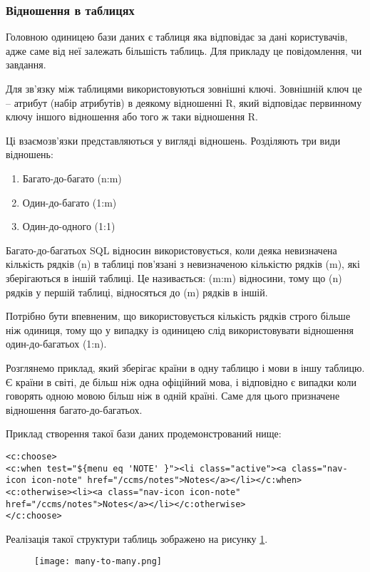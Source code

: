 \subsubsection{Відношення в таблицях}
\par Головною одиницею бази даних є таблиця яка відповідає за дані користувачів, адже саме від неї залежать більшість таблиць. Для прикладу це повідомлення, чи завдання.
\par Для зв'язку між таблицями використовуються зовнішні ключі. Зовнішній ключ це -- атрибут (набір атрибутів) в деякому відношенні R, який відповідає первинному ключу іншого відношення або того ж таки відношення R.
\par Ці взаємозв'язки представляються у вигляді відношень. Розділяють три види відношень:
\begin{enumerate}
	\item Багато-до-багато (n:m)
	\item Один-до-багато (1:m)
	\item Один-до-одного (1:1)
\end{enumerate}
\par Багато-до-багатьох SQL відносин використовується, коли деяка невизначена кількість рядків (n) в таблиці пов'язані з невизначеною кількістю рядків (m), які зберігаються в іншій таблиці. Це називається: (m:m) відносини, тому що (n) рядків у першій таблиці, відносяться до (m) рядків в іншій.
\par Потрібно бути впевненим, що використовується кількість рядків строго більше ніж одиниця, тому що у випадку із одиницею слід використовувати відношення один-до-багатьох (1:n).
\par Розглянемо приклад, який зберігає країни в одну таблицю і мови в іншу таблицю. Є країни в світі, де більш ніж одна офіційний мова, і відповідно є випадки коли говорять одною мовою більш ніж в одній країні. Саме для цього призначене відношення багато-до-багатьох. 
\par Приклад створення такої бази даних продемонстрований нище:

\begin{lstlisting}
<c:choose>
<c:when test="${menu eq 'NOTE' }"><li class="active"><a class="nav-icon icon-note" href="/ccms/notes">Notes</a></li></c:when>
<c:otherwise><li><a class="nav-icon icon-note" href="/ccms/notes">Notes</a></li></c:otherwise>
</c:choose>
\end{lstlisting}

\par Реалізація такої структури таблиць зображено на рисунку \ref{pic:many_to_many.png}.
\begin{figure}[!ht]
\centering
		\texttt{[image: many-to-many.png]}
		\label{pic:many_to_many.png}
\end{figure}

